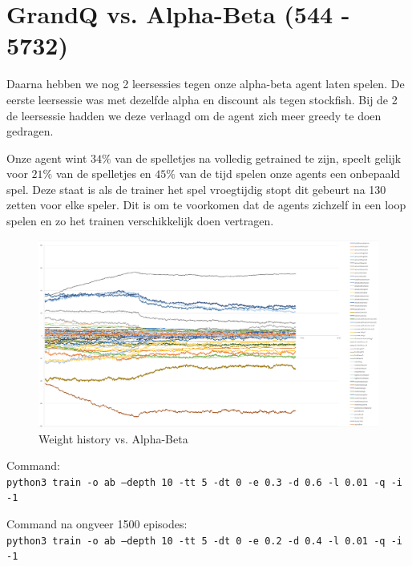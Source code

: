 \documentclass[a4paper,openany]{uantwerpenassignment}
\newcommand{\codeword}[1]{
    \colorbox{code}{\texttt{\textcolor{codetext}{#1}}}
}
\begin{document}
\section{GrandQ vs. Alpha-Beta (544 - 5732)}

Daarna hebben we nog 2 leersessies tegen onze alpha-beta agent laten spelen. De eerste leersessie was met dezelfde alpha en discount als tegen stockfish. Bij de 2 de leersessie hadden we deze verlaagd om de agent zich meer greedy te doen gedragen.

Onze agent wint $34\%$ van de spelletjes na volledig getrained te zijn, speelt gelijk voor $21\%$ van de spelletjes en $45\%$ van de tijd spelen onze agents een onbepaald spel. Deze staat is als de trainer het spel vroegtijdig stopt dit gebeurt na 130 zetten voor elke speler. Dit is om te voorkomen dat de agents zichzelf in een loop spelen en zo het trainen verschikkelijk doen vertragen.

\begin{figure}[h]
    \centering
    \includegraphics[width=\textwidth]{images/ab.png}
    \caption{Weight history vs. Alpha-Beta}
    \label{fig:ab}
\end {figure}

Command:\\
\codeword{python3 train -o ab --depth 10 -tt 5 -dt 0 -e 0.3 -d 0.6 -l 0.01 -q -i -1}

Command na ongveer 1500 episodes:\\
\codeword{python3 train -o ab --depth 10 -tt 5 -dt 0 -e 0.2 -d 0.4 -l 0.01 -q -i -1}



\end{document}
